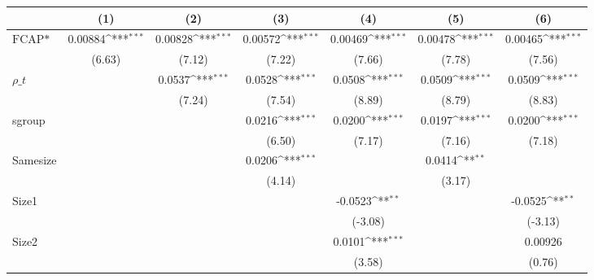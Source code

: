 {
\def\sym#1{\ifmmode^{#1}\else\(^{#1}\)\fi}
\begin{tabular}{l*{6}{c}}
\hline\hline
                    &\multicolumn{1}{c}{(1)}         &\multicolumn{1}{c}{(2)}         &\multicolumn{1}{c}{(3)}         &\multicolumn{1}{c}{(4)}         &\multicolumn{1}{c}{(5)}         &\multicolumn{1}{c}{(6)}         \\
\hline
$ \text{FCAP*} $    &     0.00884\sym{***}&     0.00828\sym{***}&     0.00572\sym{***}&     0.00469\sym{***}&     0.00478\sym{***}&     0.00465\sym{***}\\
                    &      (6.63)         &      (7.12)         &      (7.22)         &      (7.66)         &      (7.78)         &      (7.56)         \\
[1em]
 $ \rho\_t $         &                     &      0.0537\sym{***}&      0.0528\sym{***}&      0.0508\sym{***}&      0.0509\sym{***}&      0.0509\sym{***}\\
                    &                     &      (7.24)         &      (7.54)         &      (8.89)         &      (8.79)         &      (8.83)         \\
[1em]
sgroup              &                     &                     &      0.0216\sym{***}&      0.0200\sym{***}&      0.0197\sym{***}&      0.0200\sym{***}\\
                    &                     &                     &      (6.50)         &      (7.17)         &      (7.16)         &      (7.18)         \\
[1em]
Samesize            &                     &                     &      0.0206\sym{***}&                     &      0.0414\sym{**} &                     \\
                    &                     &                     &      (4.14)         &                     &      (3.17)         &                     \\
[1em]
Size1               &                     &                     &                     &     -0.0523\sym{**} &                     &     -0.0525\sym{**} \\
                    &                     &                     &                     &     (-3.08)         &                     &     (-3.13)         \\
[1em]
Size2               &                     &                     &                     &      0.0101\sym{***}&                     &     0.00926         \\
                    &                     &                     &                     &      (3.58)         &                     &      (0.76)         \\

\end{tabular}}
